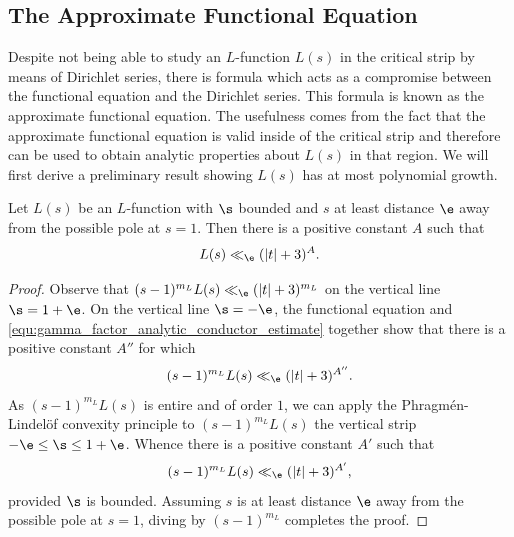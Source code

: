 \documentclass[12pt]{article}
\begin{document}
    \subsection{The Approximate Functional Equation}
      Despite not being able to study an \(L\)-function \(L(s)\) in the critical strip by means of Dirichlet series, there is formula which acts as a compromise between the functional equation and the Dirichlet series. This formula is known as the approximate functional equation. The usefulness comes from the fact that the approximate functional equation is valid inside of the critical strip and therefore can be used to obtain analytic properties about \(L(s)\) in that region. We will first derive a preliminary result showing \(L(s)\) has at most polynomial growth.

      \begin{proposition}\label{prop:L_function_bounded_in_vertical_strips}
        Let \(L(s)\) be an \(L\)-function with \(\s\) bounded and \(s\) at least distance \(\e\) away from the possible pole at \(s = 1\). Then there is a positive constant \(A\) such that
        \[
          L(s) \ll_{\e} (|t|+3)^{A}.
        \]
      \end{proposition}
      \begin{proof}
        Observe that \((s-1)^{m_{L}}L(s) \ll_{\e} (|t|+3)^{m_{L}}\) on the vertical line \(\s = 1+\e\). On the vertical line \(\s = -\e\), the functional equation and \cref{equ:gamma_factor_analytic_conductor_estimate} together show that there is a positive constant \(A''\) for which
        \[
          (s-1)^{m_{L}}L(s) \ll_{\e} (|t|+3)^{A''}.
        \]
        As \((s-1)^{m_{L}}L(s)\) is entire and of order \(1\), we can apply the Phragm\'en-Lindel\"of convexity principle to \((s-1)^{m_{L}}L(s)\) the vertical strip \(-\e \le \s \le 1+\e\). Whence there is a positive constant \(A'\) such that
        \[
          (s-1)^{m_{L}}L(s) \ll_{\e} (|t|+3)^{A'},
        \]
        provided \(\s\) is bounded. Assuming \(s\) is at least distance \(\e\) away from the possible pole at \(s = 1\), diving by \((s-1)^{m_{L}}\) completes the proof.
      \end{proof}
\end{document}
